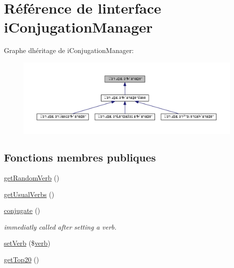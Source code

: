 \hypertarget{interfacei_conjugation_manager}{}\section{Référence de l\textquotesingle{}interface i\+Conjugation\+Manager}
\label{interfacei_conjugation_manager}


Graphe d\textquotesingle{}héritage de i\+Conjugation\+Manager\+:
\nopagebreak
\begin{figure}[H]
\begin{center}
\leavevmode
\includegraphics[width=350pt]{interfacei_conjugation_manager__inherit__graph}
\end{center}
\end{figure}
\subsection*{Fonctions membres publiques}
\begin{DoxyCompactItemize}
\item 
\hyperlink{interfacei_conjugation_manager_a2e955e8c88d45869683005343cbfac60}{get\+Random\+Verb} ()
\item 
\hyperlink{interfacei_conjugation_manager_a2a7ed39313c1c92ef5c01c88895de36e}{get\+Usual\+Verbs} ()
\item 
\hyperlink{interfacei_conjugation_manager_afba24324d7c48d3ab00ffba63cbc1b9e}{conjugate} ()
\begin{DoxyCompactList}\small\item\em immediatly called after setting a verb. \end{DoxyCompactList}\item 
\hyperlink{interfacei_conjugation_manager_a1b56822fc7f5f7b7b9c0b0c406993b3c}{set\+Verb} (\$\hyperlink{teibase_8php_aa8d8fadfcf4239c7aa288414da9d0ace}{verb})
\item 
\hyperlink{interfacei_conjugation_manager_a0273fc00cbbf9e83823d571e3e2c8945}{get\+Top20} ()
\end{DoxyCompactItemize}


